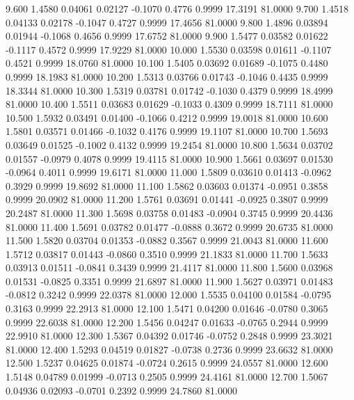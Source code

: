    9.600   1.4580   0.04061   0.02127  -0.1070   0.4776   0.9999  17.3191  81.0000
   9.700   1.4518   0.04133   0.02178  -0.1047   0.4727   0.9999  17.4656  81.0000
   9.800   1.4896   0.03894   0.01944  -0.1068   0.4656   0.9999  17.6752  81.0000
   9.900   1.5477   0.03582   0.01622  -0.1117   0.4572   0.9999  17.9229  81.0000
  10.000   1.5530   0.03598   0.01611  -0.1107   0.4521   0.9999  18.0760  81.0000
  10.100   1.5405   0.03692   0.01689  -0.1075   0.4480   0.9999  18.1983  81.0000
  10.200   1.5313   0.03766   0.01743  -0.1046   0.4435   0.9999  18.3344  81.0000
  10.300   1.5319   0.03781   0.01742  -0.1030   0.4379   0.9999  18.4999  81.0000
  10.400   1.5511   0.03683   0.01629  -0.1033   0.4309   0.9999  18.7111  81.0000
  10.500   1.5932   0.03491   0.01400  -0.1066   0.4212   0.9999  19.0018  81.0000
  10.600   1.5801   0.03571   0.01466  -0.1032   0.4176   0.9999  19.1107  81.0000
  10.700   1.5693   0.03649   0.01525  -0.1002   0.4132   0.9999  19.2454  81.0000
  10.800   1.5634   0.03702   0.01557  -0.0979   0.4078   0.9999  19.4115  81.0000
  10.900   1.5661   0.03697   0.01530  -0.0964   0.4011   0.9999  19.6171  81.0000
  11.000   1.5809   0.03610   0.01413  -0.0962   0.3929   0.9999  19.8692  81.0000
  11.100   1.5862   0.03603   0.01374  -0.0951   0.3858   0.9999  20.0902  81.0000
  11.200   1.5761   0.03691   0.01441  -0.0925   0.3807   0.9999  20.2487  81.0000
  11.300   1.5698   0.03758   0.01483  -0.0904   0.3745   0.9999  20.4436  81.0000
  11.400   1.5691   0.03782   0.01477  -0.0888   0.3672   0.9999  20.6735  81.0000
  11.500   1.5820   0.03704   0.01353  -0.0882   0.3567   0.9999  21.0043  81.0000
  11.600   1.5712   0.03817   0.01443  -0.0860   0.3510   0.9999  21.1833  81.0000
  11.700   1.5633   0.03913   0.01511  -0.0841   0.3439   0.9999  21.4117  81.0000
  11.800   1.5600   0.03968   0.01531  -0.0825   0.3351   0.9999  21.6897  81.0000
  11.900   1.5627   0.03971   0.01483  -0.0812   0.3242   0.9999  22.0378  81.0000
  12.000   1.5535   0.04100   0.01584  -0.0795   0.3163   0.9999  22.2913  81.0000
  12.100   1.5471   0.04200   0.01646  -0.0780   0.3065   0.9999  22.6038  81.0000
  12.200   1.5456   0.04247   0.01633  -0.0765   0.2944   0.9999  22.9910  81.0000
  12.300   1.5367   0.04392   0.01746  -0.0752   0.2848   0.9999  23.3021  81.0000
  12.400   1.5293   0.04519   0.01827  -0.0738   0.2736   0.9999  23.6632  81.0000
  12.500   1.5237   0.04625   0.01874  -0.0724   0.2615   0.9999  24.0557  81.0000
  12.600   1.5148   0.04789   0.01999  -0.0713   0.2505   0.9999  24.4161  81.0000
  12.700   1.5067   0.04936   0.02093  -0.0701   0.2392   0.9999  24.7860  81.0000
